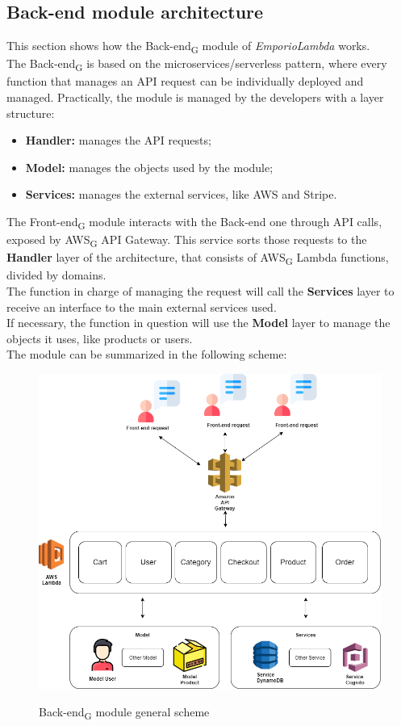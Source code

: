 \subsection{Back-end module architecture}
This section shows how the Back-end\textsubscript{G} module of \textit{EmporioLambda} works. \\The Back-end\textsubscript{G} is based on the microservices/serverless pattern, where every function that manages an API request can be individually deployed and managed. Practically, the module is managed by the developers with a layer structure:
\begin{itemize}
\item \textbf{Handler:} manages the API requests;
\item \textbf{Model:} manages the objects used by the module;
\item \textbf{Services:} manages the external services, like AWS and Stripe.
\end{itemize} 

The Front-end\textsubscript{G} module interacts with the Back-end one through API calls, exposed by AWS\textsubscript{G} API Gateway. This service sorts those requests to the \textbf{Handler} layer of the architecture, that consists of AWS\textsubscript{G} Lambda functions, divided by domains.\\
The function in charge of managing the request will call the \textbf{Services} layer to receive an interface to the main external services used.\\
If necessary, the function in question will use the \textbf{Model} layer to manage the objects it uses, like products or users.\\

The module can be summarized in the following scheme: 

\begin{figure}[H]
\centering
\includegraphics[scale=0.45]{res/Architettura/Backend/img/layerBack-end}\\
\caption{Back-end\textsubscript{G} module general scheme}
\end{figure}

